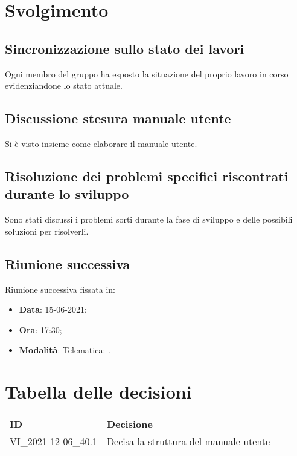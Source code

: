 \documentclass[]{article}
\begin{document}
	\newpage

	\section{Svolgimento}
		\subsection{Sincronizzazione sullo stato dei lavori}
		Ogni membro del gruppo ha esposto la situazione del proprio lavoro in corso evidenziandone lo stato attuale.\\

		\subsection{Discussione stesura manuale utente}
		Si è visto insieme come elaborare il manuale utente. \\

		\subsection{Risoluzione dei problemi specifici riscontrati durante lo sviluppo}
		Sono stati discussi i problemi sorti durante la fase di sviluppo e delle possibili soluzioni per risolverli. \\

		\subsection{Riunione successiva}
		Riunione successiva fissata in:
		\begin{itemize}
			\item \textbf{Data}: 15-06-2021;
			\item \textbf{Ora}: 17:30;
			\item \textbf{Modalità}: Telematica: .
		\end{itemize}


\section{Tabella delle decisioni}

\begin{table} [h!]
	\begin{center}
		\begin{tabular} { m{2cm} m{14cm} }
			\rowcolor{lightgray}
			\textbf{ID} & \textbf{Decisione}\\
			VI\_2021-12-06\_40.1 & Decisa la struttura del manuale utente \glock{Typescript} \\
		\end{tabular}
	\end{center}
\end{table}
\end{document}
